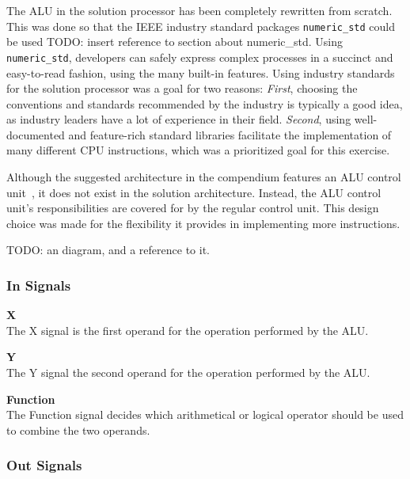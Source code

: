 The ALU in the solution processor has been completely rewritten from scratch.
This was done so that the IEEE industry standard packages \texttt{numeric\_std} could be used TODO: insert reference to section about numeric\_std.
Using \texttt{numeric\_std}, developers can safely express complex processes in a succinct and easy-to-read fashion, using the many built-in features.
Using industry standards for the solution processor was a goal for two reasons:
\textit{First}, choosing the conventions and standards recommended by the industry is typically a good idea, as industry leaders have a lot of experience in their field.
\textit{Second}, using well-documented and feature-rich standard libraries facilitate the implementation of many different CPU instructions, which was a prioritized goal for this exercise.

Although the suggested architecture in the compendium features an ALU control unit~\cite[p.115]{compendium}, it does not exist in the solution architecture.
Instead, the ALU control unit's responsibilities are covered for by the regular control unit.
This design choice was made for the flexibility it provides in implementing more instructions.

TODO: an diagram, and a reference to it.

\subsubsection{In Signals}

\begin{description}
\item{\textbf{X}} \\
The X signal is the first operand for the operation performed by the ALU.

\item{\textbf{Y}} \\
The Y signal the second operand for the operation performed by the ALU.

\item{\textbf{Function}} \\
The Function signal decides which arithmetical or logical operator should be used to combine the two operands.
\end{description}

\subsubsection{Out Signals}

